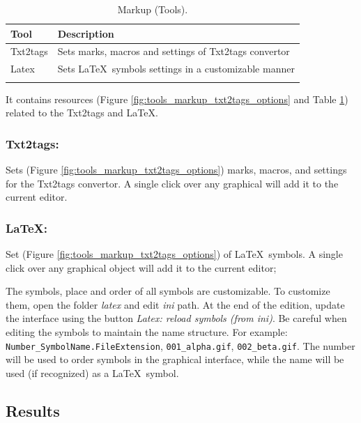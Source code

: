 \begin{table}
  \begin{footnotesize}
    \begin{tabularx}{\textwidth}{lX}\\
      \hline
      \textbf{Tool} & \textbf{Description} \\
      \hline
      Txt2tags & Sets marks, macros and settings of Txt2tags convertor \\
      Latex & Sets \LaTeX~symbols settings in a customizable manner \\
      \hline
      \\
    \end{tabularx}
  \end{footnotesize}
  \caption{Markup (Tools).}
  \label{tab:tools_markup}
\end{table}

It contains resources
(Figure \ref{fig:tools_markup_txt2tags_options} and
Table \ref{tab:tools_markup})
related to the Txt2tags and \LaTeX.


\subsubsection{Txt2tags:}

Sets
(Figure \ref{fig:tools_markup_txt2tags_options})
marks, macros, and settings for the Txt2tags convertor.
A single click over any graphical will add it to the current editor.


\subsubsection{LaTeX:}

Set
(Figure \ref{fig:tools_markup_txt2tags_options})
of \LaTeX~symbols. A single click over any graphical object
will add it to the current editor;

The symbols, place and order of all symbols are customizable.
To customize them, open the folder \textit{latex} and edit
\textit{ini} path. At the end of the edition, update the interface
using the button \textit{Latex: reload symbols (from ini)}. Be careful
when editing the symbols to maintain the name structure.
For example: \texttt{Number\_SymbolName.FileExtension},
\texttt{001\_alpha.gif}, \texttt{002\_beta.gif}. The number
will be used to order symbols in the graphical interface,
while the name will be used (if recognized) as a \LaTeX~symbol.


\hypertarget{working_tools_results}{}
\subsection{Results}

